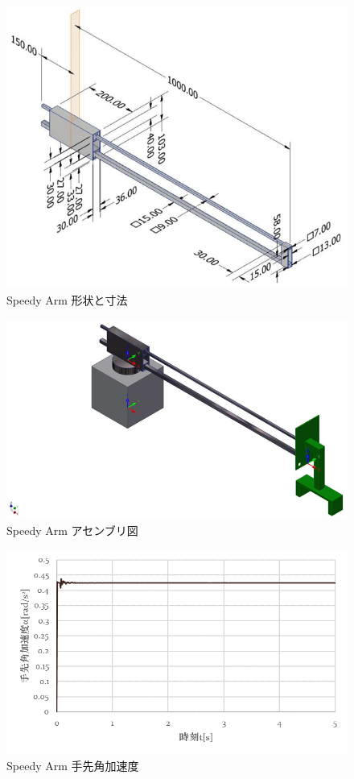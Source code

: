 \documentclass[10pt,b5paper,papersize,dvipdfmx]{jsbook}
\begin{document}
\begin{figure}[H]
  \centering
  \includegraphics[width=.8\textwidth]{img/robot22.png}
  \caption{Speedy Arm 形状と寸法}
  \label{fig:Speedy Arm 形状と寸法}
\end{figure}
%
\begin{figure}[H]
  \centering
  \includegraphics[width=.7\textwidth]{img/robot23.png}
  \caption{Speedy Arm アセンブリ図}
  \label{fig:Speedy Arm アセンブリ図}
\end{figure}
%
\begin{figure}[H]
  \centering
  \includegraphics[width=.68\textwidth]{img/robot24.png}
  \caption{Speedy Arm 手先角加速度}
  \label{fig:Speedy Arm 手先角加速度}
\end{figure}
\end{document}
